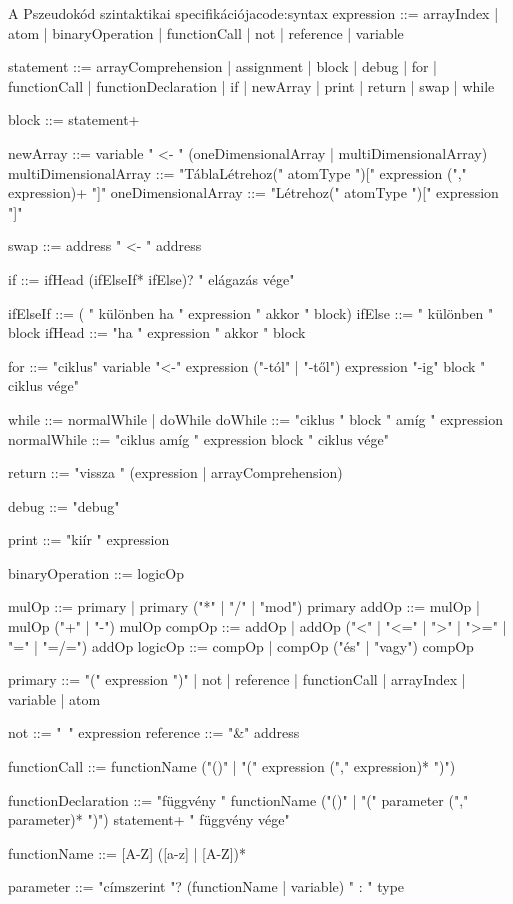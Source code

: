 \begin{code}{A Pszeudokód szintaktikai specifikációja}{code:syntax}
expression ::= arrayIndex | atom | binaryOperation | functionCall | not | reference | variable

statement ::= arrayComprehension | assignment | block | debug | for | functionCall | functionDeclaration | if | newArray | print | return | swap | while

block ::= statement+

newArray ::= variable " <- " (oneDimensionalArray | multiDimensionalArray)
multiDimensionalArray ::= "TáblaLétrehoz(" atomType ")[" expression ("," expression)+ "]"
oneDimensionalArray ::= "Létrehoz(" atomType ")[" expression "]"

swap ::= address " <- " address

if ::= ifHead (ifElseIf* ifElse)? " elágazás vége"

ifElseIf ::= ( " különben ha " expression " akkor " block)
ifElse ::= " különben " block
ifHead ::= "ha " expression " akkor " block 

for ::= "ciklus" variable "<-" expression ("-tól" | "-től") expression "-ig" block " ciklus vége"

while ::= normalWhile | doWhile
doWhile ::= "ciklus " block " amíg " expression
normalWhile ::= "ciklus amíg " expression block " ciklus vége"

return ::= "vissza " (expression | arrayComprehension) 

debug ::= "debug"

print ::= "kiír " expression

binaryOperation ::= logicOp

mulOp ::= primary | primary ("*" | "/" | "mod") primary
addOp ::= mulOp | mulOp ("+" | "-") mulOp
compOp ::= addOp | addOp ("<" | "<=" | ">" | ">=" | "=" | "=/=") addOp
logicOp ::= compOp | compOp ("és" | "vagy") compOp

primary ::= "(" expression ")" | not | reference | functionCall | arrayIndex | variable | atom

not ::= "~" expression
reference ::= "&" address

functionCall ::= functionName ("()" | "(" expression ("," expression)* ")")

functionDeclaration ::= "függvény " functionName ("()" | "(" parameter ("," parameter)* ")") statement+ " függvény vége"

functionName ::= [A-Z] ([a-z] | [A-Z])*

parameter ::= "címszerint "? (functionName | variable) " : " type


\end{code}
